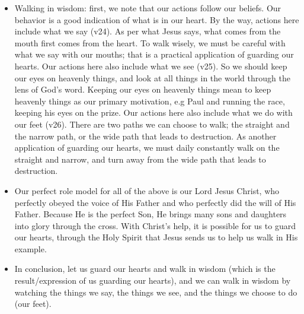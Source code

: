 \begin{itemize}
  \item{Walking in wisdom: first, we note that our actions follow our
  beliefs.  Our behavior is a good indication of what is in our heart.  By
  the way, actions here include what we say (v24).  As per what Jesus says,
  what comes from the mouth first comes from the heart.  To walk wisely, we
  must be careful with what we say with our mouths; that is a practical
  application of guarding our hearts.  Our actions here also include what we
  see (v25).  So we should keep our eyes on heavenly things, and look at all
  things in the world through the lens of God's word.  Keeping our eyes on
  heavenly things mean to keep heavenly things as our primary motivation, e.g
  Paul and running the race, keeping his eyes on the prize.  Our actions here
  also include what we do with our feet (v26).  There are two paths we can
  choose to walk; the straight and the narrow path, or the wide path that
  leads to destruction.  As another application of guarding our hearts, we
  must daily constantly walk on the straight and narrow, and turn away from
  the wide path that leads to destruction.}
  \item{Our perfect role model for all of the above is our Lord Jesus Christ,
  who perfectly obeyed the voice of His Father and who perfectly did the will
  of His Father.  Because He is the perfect Son, He brings many sons and
  daughters into glory through the cross.  With Christ's help, it is possible
  for us to guard our hearts, through the Holy Spirit that Jesus sends us to
  help us walk in His example.}
  \item{In conclusion, let us guard our hearts and walk in wisdom (which is
  the result/expression of us guarding our hearts), and we can walk in wisdom
  by watching the things we say, the things we see, and the things we choose
  to do (our feet).}

\end{itemize}